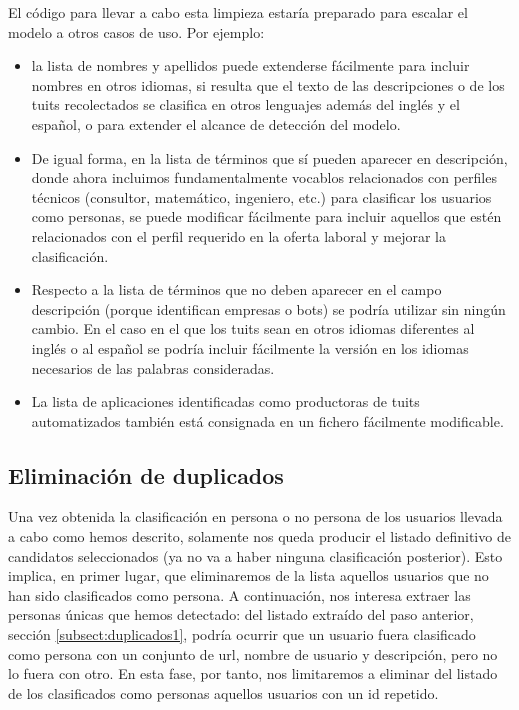 El código para llevar a cabo esta limpieza estaría preparado para escalar
el modelo a otros casos de uso. Por ejemplo:
\begin{itemize}
\item la lista de nombres y apellidos puede extenderse fácilmente para incluir nombres
en otros idiomas, si resulta que el texto de las descripciones o de los tuits recolectados
se clasifica en otros lenguajes además del inglés y el español, o para extender el alcance de
detección del modelo.
\item De igual forma, en la lista de términos que sí pueden aparecer en descripción, donde ahora
incluimos fundamentalmente vocablos relacionados con perfiles técnicos (consultor, matemático, ingeniero, etc.)
para clasificar los usuarios como personas, se puede modificar fácilmente para incluir aquellos que estén 
relacionados con el perfil requerido en la oferta laboral y mejorar la clasificación.
\item Respecto a la lista de términos que no deben aparecer en el campo descripción (porque identifican empresas 
o bots) se podría utilizar sin ningún cambio. En el caso en el que los tuits sean en otros idiomas diferentes 
al inglés o al español se podría incluir fácilmente la versión en los idiomas necesarios de las palabras 
consideradas.
\item La lista de aplicaciones identificadas como productoras de tuits automatizados también
está consignada en un fichero fácilmente modificable.
\end{itemize}

\subsection{Eliminación de duplicados}
\label{subsect:duplicados2}
Una vez obtenida la clasificación en persona o no persona de los usuarios llevada a cabo como
hemos descrito, solamente nos queda producir el listado definitivo de candidatos seleccionados 
(ya no va a haber ninguna clasificación posterior). Esto implica, en primer lugar, que eliminaremos
de la lista aquellos usuarios que no han sido clasificados como persona. A continuación, nos interesa
extraer las personas únicas que hemos detectado: del listado extraído del paso anterior, 
sección \ref{subsect:duplicados1}, podría ocurrir que un usuario  fuera clasificado como persona con un
conjunto de url, nombre de usuario y descripción, pero no lo fuera con otro. En esta fase, por tanto, nos limitaremos a eliminar del listado de los clasificados como personas aquellos usuarios con un id repetido.

